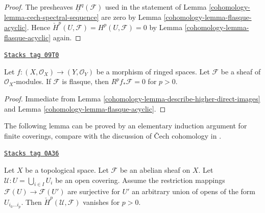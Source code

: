 \begin{proof}

The presheaves $\underline{H}^q(\mathcal{F})$ used in the statement
of Lemma \ref{cohomology-lemma-cech-spectral-sequence} are zero by
Lemma \ref{cohomology-lemma-flasque-acyclic}.
Hence $\check{H}^p(U, \mathcal{F}) = H^p(U, \mathcal{F}) = 0$
by Lemma \ref{cohomology-lemma-flasque-acyclic} again.
\end{proof}

\begin{lemma}
\label{cohomology-lemma-flasque-acyclic-pushforward}
\href{https://stacks.math.columbia.edu/tag/09T0}{\texttt{Stacks tag 09T0}}

Let $f : (X, \mathcal{O}_X) \to (Y, \mathcal{O}_Y)$ be a morphism
of ringed spaces. Let $\mathcal{F}$ be a sheaf of $\mathcal{O}_X$-modules.
If $\mathcal{F}$ is flasque, then $R^pf_*\mathcal{F} = 0$ for $p > 0$.
\end{lemma}

\begin{proof}

Immediate from
Lemma \ref{cohomology-lemma-describe-higher-direct-images} and
Lemma \ref{cohomology-lemma-flasque-acyclic}.
\end{proof}

The following lemma can be proved by an elementary induction
argument for finite coverings, compare with the discussion
of {\v C}ech cohomology in \cite{FOAG}.

\begin{lemma}
\label{cohomology-lemma-vanishing-ravi}
\href{https://stacks.math.columbia.edu/tag/0A36}{\texttt{Stacks tag 0A36}}

Let $X$ be a topological space. Let $\mathcal{F}$ be an abelian sheaf
on $X$. Let $\mathcal{U} : U = \bigcup_{i \in I} U_i$ be an
open covering. Assume the restriction mappings
$\mathcal{F}(U) \to \mathcal{F}(U')$ are surjective
for $U'$ an arbitrary union of opens of the form $U_{i_0 \ldots i_p}$.
Then $\check{H}^p(\mathcal{U}, \mathcal{F})$
vanishes for $p > 0$.
\end{lemma}

